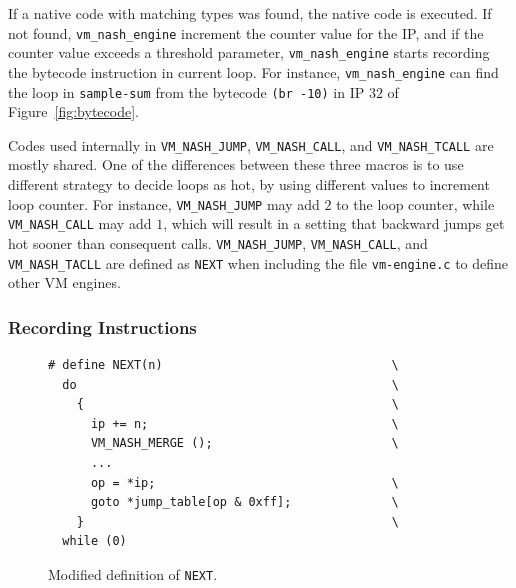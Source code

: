 \documentclass[preprint, 10pt]{sigplanconf}
\begin{document}
If a native code with matching types was found, the native code is executed. If
not found, \texttt{vm\_nash\_engine} increment the counter value for the IP, and
if the counter value exceeds a threshold parameter, \texttt{vm\_nash\_engine}
starts recording the bytecode instruction in current loop. For instance,
\texttt{vm\_nash\_engine} can find the loop in \texttt{sample-sum} from the
bytecode \texttt{(br~-10)} in IP $32$ of
Figure~\hyperref[fig:bytecode]{\ref{fig:bytecode}}.

Codes used internally in \texttt{VM\_NASH\_JUMP}, \texttt{VM\_NASH\_CALL}, and
\texttt{VM\_NASH\_TCALL} are mostly shared. One of the differences between these
three macros is to use different strategy to decide loops as hot, by using
different values to increment loop counter. For instance,
\texttt{VM\_NASH\_JUMP} may add $2$ to the loop counter, while
\texttt{VM\_NASH\_CALL} may add $1$, which will result in a setting that
backward jumps get hot sooner than consequent calls.  \texttt{VM\_NASH\_JUMP},
\texttt{VM\_NASH\_CALL}, and \texttt{VM\_NASH\_TACLL} are defined as
\texttt{NEXT} when including the file \texttt{vm-engine.c} to define other VM
engines.

\subsubsection{Recording Instructions}

\begin{figure}
  \centering
  \small
\begin{verbatim}
# define NEXT(n)                                \
  do                                            \
    {                                           \
      ip += n;                                  \
      VM_NASH_MERGE ();                         \
      ...
      op = *ip;                                 \
      goto *jump_table[op & 0xff];              \
    }                                           \
  while (0)
\end{verbatim}
\caption{Modified definition of \texttt{NEXT}.}
\label{fig:cnext}
\end{figure}
\end{document}
